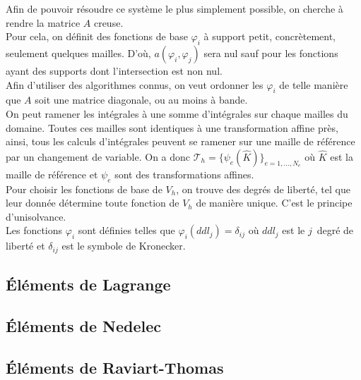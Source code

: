 Afin de pouvoir résoudre ce système le plus simplement possible, on cherche à rendre la matrice $A$ creuse.\\
Pour cela, on définit des fonctions de base $\varphi_i$ à support petit, concrètement, seulement quelques mailles. D'où, $a(\varphi_i,\varphi_j)$ sera nul sauf pour les fonctions ayant des supports dont l'intersection est non nul.\\
Afin d'utiliser des algorithmes connus, on veut ordonner les $\varphi_i$ de telle manière que $A$ soit une matrice diagonale, ou au moins à bande.\\

On peut ramener les intégrales à une somme d'intégrales sur chaque mailles du domaine. Toutes ces mailles sont identiques à une transformation affine près, ainsi, tous les calculs d'intégrales peuvent se ramener sur une maille de référence par un changement de variable. On a donc $\mathcal{T}_h=\{\psi_e(\hat{K})\}_{e=1,\dots,N_e}$ où $\hat{K}$ est la maille de référence et $\psi_e$ sont des transformations affines.\\

Pour choisir les fonctions de base de $V_h$, on trouve des degrés de liberté, tel que leur donnée détermine toute fonction de $V_h$ de manière unique. C'est le principe d'unisolvance.\\
Les fonctions $\varphi_i$ sont  définies telles que $\varphi_i(ddl_j)=\delta_{ij}$ où $ddl_j$ est le $j$\ieme\ degré de liberté et $\delta_{ij}$ est le symbole de Kronecker.

\subsection{Éléments de Lagrange}
\label{eltLagrange}\cite{Courant1943}
\subsection{Éléments de Nedelec}
\label{eltNedelec}\cite{Nedelec80,Nedelec86}
\subsection{Éléments de Raviart-Thomas}
\label{eltRT}\cite{Raviart77}

